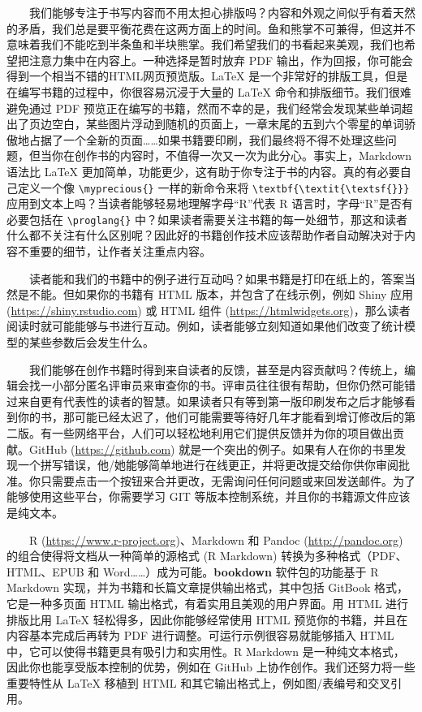 \documentclass[
  12pt,
]{krantz}
\theoremstyle{definition}
\theoremstyle{definition}
\theoremstyle{definition}
\theoremstyle{definition}
\theoremstyle{remark}
\begin{document}
  我们能够专注于书写内容而不用太担心排版吗？内容和外观之间似乎有着天然的矛盾，我们总是要平衡花费在这两方面上的时间。鱼和熊掌不可兼得，但这并不意味着我们不能吃到半条鱼和半块熊掌。我们希望我们的书看起来美观，我们也希望把注意力集中在内容上。一种选择是暂时放弃 PDF 输出，作为回报，你可能会得到一个相当不错的HTML网页预览版。LaTeX 是一个非常好的排版工具，但是在编写书籍的过程中，你很容易沉浸于大量的 LaTeX 命令和排版细节。我们很难避免通过 PDF 预览正在编写的书籍，然而不幸的是，我们经常会发现某些单词超出了页边空白，某些图片浮动到随机的页面上，一章末尾的五到六个零星的单词骄傲地占据了一个全新的页面\ldots\ldots 如果书籍要印刷，我们最终将不得不处理这些问题，但当你在创作书的内容时，不值得一次又一次为此分心。事实上，Markdown 语法比 LaTeX 更加简单，功能更少，这有助于你专注于书的内容。真的有必要自己定义一个像 \texttt{\textbackslash{}myprecious\{\}} 一样的新命令来将 \texttt{\textbackslash{}textbf\{\textbackslash{}textit\{\textbackslash{}textsf\{\}\}\}} 应用到文本上吗？当读者能够轻易地理解字母``R''代表 R 语言时，字母``R''是否有必要包括在 \texttt{\textbackslash{}proglang\{\}} 中？如果读者需要关注书籍的每一处细节，那这和读者什么都不关注有什么区别呢？因此好的书籍创作技术应该帮助作者自动解决对于内容不重要的细节，让作者关注重点内容。

  读者能和我们的书籍中的例子进行互动吗？如果书籍是打印在纸上的，答案当然是不能。但如果你的书籍有 HTML 版本，并包含了在线示例，例如 Shiny 应用 (\url{https://shiny.rstudio.com}) 或 HTML 组件 (\url{https://htmlwidgets.org})，那么读者阅读时就可能能够与书进行互动。例如，读者能够立刻知道如果他们改变了统计模型的某些参数后会发生什么。

  我们能够在创作书籍时得到来自读者的反馈，甚至是内容贡献吗？传统上，编辑会找一小部分匿名评审员来审查你的书。评审员往往很有帮助，但你仍然可能错过来自更有代表性的读者的智慧。如果读者只有等到第一版印刷发布之后才能够看到你的书，那可能已经太迟了，他们可能需要等待好几年才能看到增订修改后的第二版。有一些网络平台，人们可以轻松地利用它们提供反馈并为你的项目做出贡献。GitHub (\url{https://github.com}) 就是一个突出的例子。如果有人在你的书里发现一个拼写错误，他/她能够简单地进行在线更正，并将更改提交给你供你审阅批准。你只需要点击一个按钮来合并更改，无需询问任何问题或来回发送邮件。为了能够使用这些平台，你需要学习 GIT 等版本控制系统，并且你的书籍源文件应该是纯文本。

  R (\url{https://www.r-project.org})、Markdown 和 Pandoc (\url{http://pandoc.org}) 的组合使得将文档从一种简单的源格式 (R Markdown) 转换为多种格式（PDF、HTML、EPUB 和 Word\ldots\ldots）成为可能。\textbf{bookdown} 软件包的功能基于 R Markdown 实现，并为书籍和长篇文章提供输出格式，其中包括 GitBook 格式，它是一种多页面 HTML 输出格式，有着实用且美观的用户界面。用 HTML 进行排版比用 LaTeX 轻松得多，因此你能够经常使用 HTML 预览你的书籍，并且在内容基本完成后再转为 PDF 进行调整。可运行示例很容易就能够插入 HTML 中，它可以使得书籍更具有吸引力和实用性。R Markdown 是一种纯文本格式，因此你也能享受版本控制的优势，例如在 GitHub 上协作创作。我们还努力将一些重要特性从 LaTeX 移植到 HTML 和其它输出格式上，例如图/表编号和交叉引用。
\end{document}

